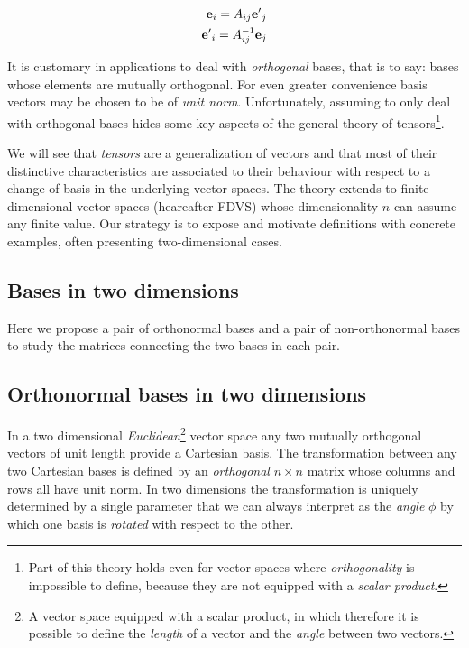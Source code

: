 \begin{subequations}
\label{eq:twoway_basis_change}
\begin{align}
\vb{e}_i = A_{ij} {\vb{e}'}_j \\ 
{\vb{e}'}_i = A_{ij}^{-1} \vb{e}_j
\end{align}
\end{subequations}



It is customary in applications to deal with \textit{orthogonal} bases, that is to say: bases whose elements are mutually orthogonal. For even greater convenience basis vectors may be chosen to be of \textit{unit norm}. 
Unfortunately, assuming to only deal with orthogonal bases hides some key aspects of the general theory of tensors\footnote{Part of this theory holds even for vector spaces where \textit{orthogonality} is impossible to define, because they are not equipped with a \textit{scalar product}.}.   

We will see that \textit{tensors} are a generalization of vectors and that most of their distinctive characteristics are associated to their behaviour with respect to a change of basis in the underlying vector spaces. The theory extends to finite dimensional vector spaces (heareafter FDVS) whose dimensionality $n$ can assume any finite value. Our strategy is to expose and motivate definitions with concrete examples, often presenting two-dimensional cases.

\subsection{Bases in two dimensions}
Here we propose a pair of orthonormal bases and a pair of non-orthonormal bases to study the matrices connecting the two bases in each pair.  

\subsection{Orthonormal bases in two dimensions}
In a two dimensional \textit{Euclidean}\footnote{A vector space equipped with a scalar product, in which therefore it is possible to define the \textit{length} of a vector and the \textit{angle} between two vectors.} vector space any two mutually orthogonal vectors of unit length provide a Cartesian basis. The transformation between any two Cartesian bases is defined by an \textit{orthogonal} $n \times n$ matrix whose columns and rows all have unit norm. In two dimensions the transformation is uniquely determined by a single parameter that we can always interpret as the \textit{angle} $\phi$ by which one basis is \textit{rotated} with respect to the other. 

